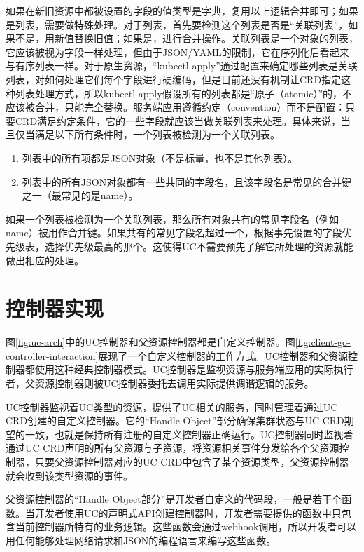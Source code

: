 \documentclass[macfonts,master]{njuthesis}
\begin{document}
如果在新旧资源中都被设置的字段的值类型是字典，复用以上逻辑合并即可；如果是列表，需要做特殊处理。对于列表，首先要检测这个列表是否是``关联列表''，如果不是，用新值替换旧值；如果是，进行合并操作。关联列表是一个对象的列表，它应该被视为字段一样处理，但由于JSON/YAML的限制，它在序列化后看起来与有序列表一样。对于原生资源，``kubectl apply''通过配置来确定哪些列表是关联列表，对如何处理它们每个字段进行硬编码，但是目前还没有机制让CRD指定这种列表处理方式，所以kubectl apply假设所有的列表都是``原子（atomic）''的，不应该被合并，只能完全替换。服务端应用遵循约定（convention）而不是配置：只要CRD满足约定条件，它的一些字段就应该当做关联列表来处理。具体来说，当且仅当满足以下所有条件时，一个列表被检测为一个关联列表。

\begin{enumerate}
	\item 列表中的所有项都是JSON对象（不是标量，也不是其他列表）。
	\item 列表中的所有JSON对象都有一些共同的字段名，且该字段名是常见的合并键之一（最常见的是name）。
\end{enumerate}

如果一个列表被检测为一个关联列表，那么所有对象共有的常见字段名（例如name）被用作合并键。如果共有的常见字段名超过一个，根据事先设置的字段优先级表，选择优先级最高的那个。这使得UC不需要预先了解它所处理的资源就能做出相应的处理。


\section{控制器实现}

图\ref{fig:uc-arch}中的UC控制器和父资源控制器都是自定义控制器。图\ref{fig:client-go-controller-interaction}展现了一个自定义控制器的工作方式。UC控制器和父资源控制器都使用这种经典控制器模式。UC控制器是监视资源与服务端应用的实际执行者，父资源控制器则被UC控制器委托去调用实际提供调谐逻辑的服务。

UC控制器监视着UC类型的资源，提供了UC相关的服务，同时管理着通过UC CRD创建的自定义控制器。它的``Handle Object''部分确保集群状态与UC CRD期望的一致，也就是保持所有注册的自定义控制器正确运行。UC控制器同时监视着通过UC CRD声明的所有父资源与子资源，将资源相关事件分发给各个父资源控制器，只要父资源控制器对应的UC CRD中包含了某个资源类型，父资源控制器就会收到该类型资源的事件。

父资源控制器的``Handle Object部分''是开发者自定义的代码段，一般是若干个函数。当开发者使用UC的声明式API创建控制器时，开发者需要提供的函数中只包含当前控制器所特有的业务逻辑。这些函数会通过webhook调用，所以开发者可以用任何能够处理网络请求和JSON的编程语言来编写这些函数。
\end{document}
